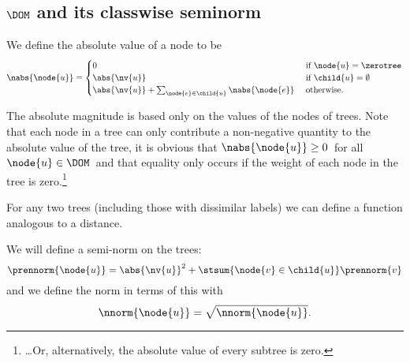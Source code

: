 \subsection{$\DOM$ and its classwise seminorm}
\begin{definition}\label{absolute-mag}
 We define the absolute value of a node to be
\begin{align*}
\nabs{\node{u}} = \begin{cases}
  0 & \text{ if } \node{u} = \zerotree \\
  \abs{\nv{u}} & \text{ if }\child{u} = \emptyset \\
  \abs{\nv{u}} + \sum_{\node{e}\in\child{u}}\nabs{\node{e}} & \text{ otherwise.}
\end{cases}
\end{align*}
\end{definition}
The absolute magnitude is based only on the values of the
nodes of trees. %
Note that each node in a tree can only contribute a non-negative
quantity to the absolute value of the tree, it is obvious that
\(\nabs{\node{u}} \geq 0\)\ for all \(\node{u} \in \DOM\)\ and that
equality only occurs if the weight of each node in the tree 
is zero.\footnote{\ldots Or, alternatively, the absolute value of every subtree is zero.}

For any two trees (including those with dissimilar labels) we can
define a function analogous to a distance.

\begin{definition}\label{treenorm}
  We will define a semi-norm on the trees:
  \begin{equation}
    \prennorm{\node{u}}={\abs{\nv{u}}^2 + \stsum{\node{v}\in\child{u}} \prennorm{v}}
  \end{equation}
  and we define the norm in terms of this with
  \begin{equation}
    \nnorm{\node{u}}=\sqrt{\nnorm{\node{u}}}.
  \end{equation}
\end{definition}

